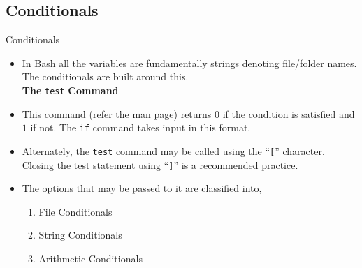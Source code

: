 \documentclass{beamer}
\begin{document}
\subsection{Conditionals}
\begin{frame}[fragile]{Conditionals}
  \begin{itemize}
  \item In Bash all the variables are fundamentally strings denoting
    file/folder names. The conditionals are built around this.\\
    \textbf{The} \verb+test+ \textbf{Command}
  \item This command (refer the man page) returns $0$ if the condition
    is satisfied and $1$ if not. The \verb|if| command takes input in
    this format.
  \item Alternately, the \verb+test+ command may be called using the
    ``\verb|[|'' character. Closing the test statement using
    ``\verb|]|'' is a recommended practice.
  \item The options that may be passed to it are classified into,
    \begin{enumerate}
    \item File Conditionals
    \item String Conditionals
    \item Arithmetic Conditionals
    \end{enumerate}
  \end{itemize}
\end{frame}
\end{document}
